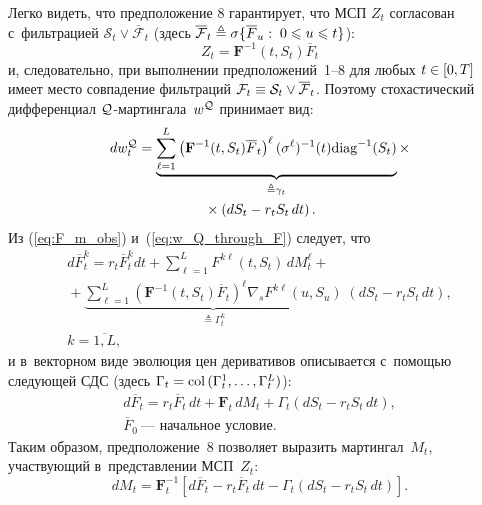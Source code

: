 \begin{multicols}{2}
Легко видеть, что предположение 8 гарантирует, что МСП
$Z_t$ согласован с~фильтрацией {$\mathcal{S}_t \vee \overline{\mathcal{F}}_t$} 
(здесь {$\overline{\mathcal{F}}_t \triangleq \sigma \{\overline{F}_u: \; 0 \hm\leqslant u\hm \leqslant t\}$}):
\begin{equation}
Z_t = \mathbf{F}^{-1}(t,S_t)\overline{F}_t
\label{eq:Z_through_F}
\end{equation}
и, следовательно, при выполнении предположений~1--8 для любых  $t \hm\in [0,T]$ имеет место совпадение фильтраций
 $\ff_t \hm\equiv \mathcal{S}_t \vee \overline{\mathcal{F}}_t$.
 Поэтому стохастический дифференциал ${\mathcal Q}$-мар\-тин\-га\-ла~$w^{{\mathcal Q}}$ принимает вид:
\begin{multline}
dw_t^{{\mathcal Q}} = \underbrace{
\sum\limits_{\ell=1}^L \left( \mathbf{F}^{-1}(t,S_t)\overline{F}_t\right)^{\ell}
(\sigma^{\ell})^{-1}(t) \mathrm{diag}^{-1} (S_t)}_{\triangleq \gamma_t} \times{}\\
{}\times
\left(dS_t - r_tS_t \,dt \right).
\label{eq:w_Q_through_F}
\end{multline}
Из (\ref{eq:F_m_obs}) и~(\ref{eq:w_Q_through_F}) следует, что
\begin{multline*}
d\overline{F}_t^k = r_t\overline{F}_t^k dt  + \sum\limits_{\ell=1}^L F^{k\ell}(t,S_t)\,dM_t^{\ell} +{} \\ 
{} +
\underbrace{\sum\limits_{\ell=1}^L  \left( \mathbf{F}^{-1}(t,S_t)\overline{F}_t\right)^{\ell} \nabla_s F^{k\ell}(u, S_u)}_{\triangleq \Gamma_t^k} \;
\!\left( dS_t-r_tS_t\,dt
\right), \\
k=\overline{1,L},
\end{multline*}
и в~векторном виде эволюция цен деривативов описывается с~помощью следующей СДС (здесь $\Gamma_t\hm = \col(\Gamma_t^1, \ldots, \Gamma_t^L)$):
 \begin{multline*}
d\overline{F}_t = r_t\overline{F}_t\,dt + \mathbf{F}_t \,dM_t +
\Gamma_t\left(
dS_t-r_tS_t\,dt
\right), \\
\overline{F}_0\ \mbox{--- начальное условие.}
\end{multline*}
Таким образом, предположение~8 позволяет выразить мартингал~$M_t$, участвующий в~представлении МСП~$Z_t$:
\begin{equation}
dM_t = \mathbf{F}^{-1}_t \left[ d\overline{F}_t - r_t\overline{F}_t\,dt -\Gamma_t\left( dS_t-r_tS_t\,dt \right)
\right]\!.\!
\label{eq:M_through_SF}
\end{equation}


\end{multicols}
